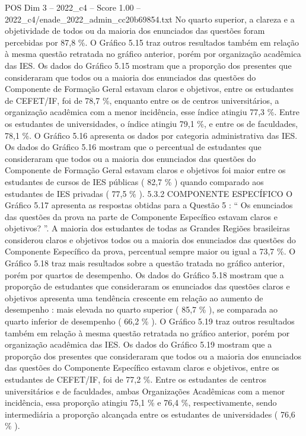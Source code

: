 \begin{textsample}{POS Dim 3 – 2022\_c4 – Score 1.00 – 2022\_c4/enade\_2022\_admin\_cc20b69854.txt}
No quarto superior, a clareza e a objetividade de todos ou da maioria dos enunciados das questões foram percebidas por 87,8 \%.
O Gráfico 5.15 traz outros resultados também em relação à mesma questão retratada no gráfico anterior, porém por organização acadêmica das IES.
Os dados do Gráfico 5.15 mostram que a proporção dos presentes que consideraram que todos ou a maioria dos enunciados das questões do Componente de Formação Geral estavam claros e objetivos, entre os estudantes de CEFET/IF, foi de 78,7 \%, enquanto entre os de centros universitários, a organização acadêmica com a menor incidência, esse índice atingiu 77,3 \%.
Entre os estudantes de universidades, o índice atingiu 79,1 \%, e entre os de faculdades, 78,1 \%.
O Gráfico 5.16 apresenta os dados por categoria administrativa das IES.
Os dados do Gráfico 5.16 mostram que o percentual de estudantes que consideraram que todos ou a maioria dos enunciados das questões do Componente de Formação Geral estavam claros e objetivos foi maior entre os estudantes de cursos de IES públicas ( 82,7 \% ) quando comparado aos estudantes de IES privadas ( 77,5 \% ). 5.3.2 COMPONENTE ESPECÍFICO O Gráfico 5.17 apresenta as respostas obtidas para a Questão 5 : “ Os enunciados das questões da prova na parte de Componente Específico estavam claros e objetivos? ”.
A maioria dos estudantes de todas as Grandes Regiões brasileiras considerou claros e objetivos todos ou a maioria dos enunciados das questões do Componente Específico da prova, percentual sempre maior ou igual a 73,7 \%.
O Gráfico 5.18 traz mais resultados sobre a questão tratada no gráfico anterior, porém por quartos de desempenho.
Os dados do Gráfico 5.18 mostram que a proporção de estudantes que consideraram os enunciados das questões claros e objetivos apresenta uma tendência crescente em relação ao aumento de desempenho : mais elevada no quarto superior ( 85,7 \% ), se comparada ao quarto inferior de desempenho ( 66,2 \% ).
O Gráfico 5.19 traz outros resultados também em relação à mesma questão retratada no gráfico anterior, porém por organização acadêmica das IES.
Os dados do Gráfico 5.19 mostram que a proporção dos presentes que consideraram que todos ou a maioria dos enunciados das questões do Componente Específico estavam claros e objetivos, entre os estudantes de CEFET/IF, foi de 77,2 \%.
Entre os estudantes de centros universitários e de faculdades, ambas Organizações Acadêmicas com a menor incidência, essa proporção atingiu 75,1 \% e 76,4 \%, respectivamente, sendo intermediária a proporção alcançada entre os estudantes de universidades ( 76,6 \% ).

\end{textsample}
